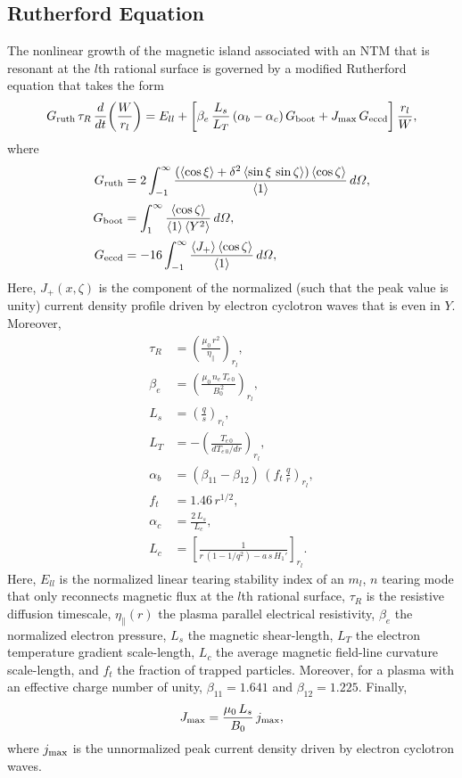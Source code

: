 \documentclass[12pt,prb,aps]{revtex4-1}
\begin{document}
\subsection{Rutherford Equation}
The nonlinear growth of the magnetic island associated with an NTM that is resonant at the $l$th rational surface is governed by a modified Rutherford equation that takes the form\,\cite{ntm1,ntm4,island,boot,fitz}
\begin{equation}\label{eruth}
G_{\rm ruth}\,\tau_R\,\frac{d}{dt}\!\left(\frac{W}{r_l}\right) = E_{ll} +\left[\beta_e\,\frac{L_s}{L_T}\,(\alpha_b-\alpha_c)\,G_{\rm boot} + J_{\rm max}\,G_{\rm eccd}\right]
\frac{r_l}{W},
\end{equation}
where
\begin{align}
G_{\rm ruth} &= 2\int_{-1}^\infty \frac{(\langle\cos\xi\rangle + \delta^2\,\langle \sin\xi\,\sin\zeta\rangle)\,\langle \cos\zeta\rangle}{\langle 1\rangle}\,d{\mit\Omega},\\[0.5ex]
G_{\rm boot} &= \int_1^\infty \frac{\langle \cos\zeta\rangle}{\langle 1\rangle\,\langle Y^2\rangle}\,d{\mit\Omega},\\[0.5ex]
G_{\rm eccd} &= - 16\int_{-1}^\infty \frac{\langle J_+\rangle\,\langle \cos\zeta\rangle}{\langle 1\rangle}\,d{\mit\Omega},\label{geccd}
\end{align}
Here,  $J_+(x,\zeta)$ is the component of the normalized  (such that the peak value is unity) current density profile driven by electron cyclotron waves that is even in $Y$. 
Moreover, 
\begin{align}
\tau_R &= \left(\frac{\mu_0\,r^2}{\eta_\parallel}\right)_{r_l},\\[0.5ex]
\beta_e &= \left(\frac{\mu_0\,n_e\,T_{e\,0}}{B_0^{\,2}}\right)_{r_l},\\[0.5ex]
L_s&=\left(\frac{q}{s}\right)_{r_l},\\[0.5ex]
L_T &= -\left(\frac{T_{e\,0}}{dT_{e\,0}/dr}\right)_{r_l},\\[0.5ex]
\alpha_b &=(\beta_{11}-\beta_{12})\, \left(f_t\,\frac{q}{r}\right)_{r_l},\\[0.5ex]
f_t&= 1.46\,r^{1/2},\\[0.5ex]
\alpha_c &= \frac{2\,L_s}{L_c},\\[0.5ex]
L_c &= \left[\frac{1}{r\,(1-1/q^2) -a\,s\,H_1'}\right]_{r_l}.
\end{align}
Here, $E_{ll}$ is the  normalized linear tearing stability index of an $m_l$, $n$ tearing mode
 that only reconnects magnetic flux at the $l$th rational surface,\cite{tear5} $\tau_R$ is the resistive diffusion timescale, $\eta_\parallel(r)$  the plasma parallel electrical resistivity, $\beta_e$ the normalized electron pressure, $L_s$  the magnetic shear-length, 
$L_T$ the electron temperature gradient scale-length, $L_c$ the average magnetic field-line curvature scale-length, and $f_t$  the fraction of trapped particles. Moreover, for a plasma with an effective charge
number of unity, $\beta_{11}=1.641$ and $\beta_{12}= 1.225$.\cite{fitz}
Finally,
\begin{equation}
J_{\rm max} = \frac{\mu_0\,L_s}{B_0}\,j_{\rm max},
\end{equation}
where $j_{\rm max}$ is the unnormalized peak current density driven by electron cyclotron waves.  
 
\end{document}
